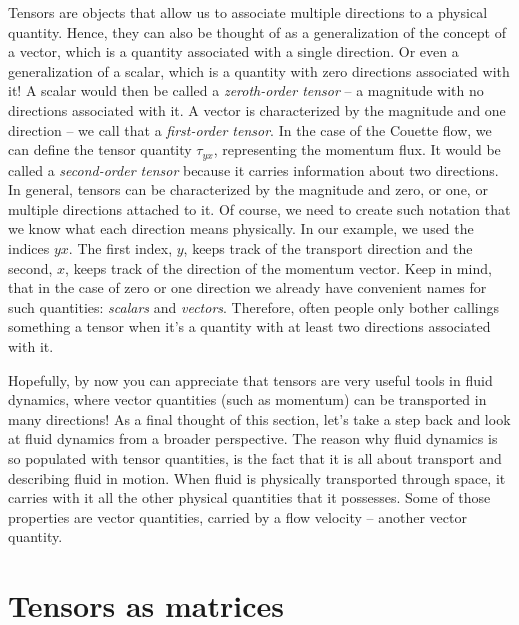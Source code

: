 \documentclass[10pt,twocolumn]{article}
\begin{document}
Tensors are objects that allow us to associate multiple directions to a physical quantity. Hence, they can also be thought of as a generalization of the concept of a vector, which is a quantity associated with a single direction. Or even a generalization of a scalar, which is a quantity with zero directions associated with it! A scalar would then be called a \textit{zeroth-order tensor} -- a magnitude with no directions associated with it. A vector is characterized by the magnitude and one direction -- we call that a \textit{first-order tensor}. In the case of the Couette flow, we can define the tensor quantity $\tau_{yx}$, representing the momentum flux. It would be called a \textit{second-order tensor} because it carries information about two directions. In general, tensors can be characterized by the magnitude and zero, or one, or multiple directions attached to it. Of course, we need to create such notation that we know what each direction means physically. In our example, we used the indices $yx$. The first index, $y$, keeps track of the transport direction and the second, $x$, keeps track of the direction of the momentum vector. Keep in mind, that in the case of zero or one direction we already have convenient names for such quantities: \textit{scalars} and \textit{vectors}. Therefore, often people only bother callings something a tensor when it's a quantity with at least two directions associated with it.

Hopefully, by now you can appreciate that tensors are very useful tools in fluid dynamics, where vector quantities (such as momentum) can be transported in many directions! As a final thought of this section, let's take a step back and look at fluid dynamics from a broader perspective. The reason why fluid dynamics is so populated with tensor quantities, is the fact that it is all about transport and describing fluid in motion. When fluid is physically transported through space, it carries with it all the other physical quantities that it possesses. Some of those properties are vector quantities, carried by a flow velocity -- another vector quantity.

\section*{Tensors as matrices}
\end{document}
